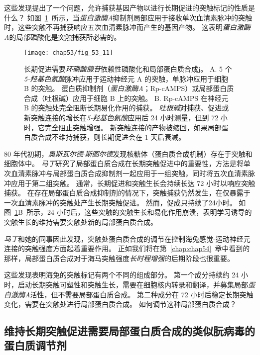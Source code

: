 这些发现提出了一个问题，允许捕获基因产物以进行长期促进的突触标记的性质是什么？
如图~\ref{fig:53_11}~所示，当\textit{蛋白激酶A}抑制剂局部应用于接收单次血清素脉冲的突触时，这些突触不再捕获响应五次血清素脉冲而产生的基因产物。
这表明\textit{蛋白激酶A}的局部磷酸化是突触捕获所必需的。


\begin{figure}[htbp]
	\centering
	\texttt{[image: chap53/fig\_53\_11]}
	\caption{长期促进需要\textit{环磷酸腺苷}依赖性磷酸化和局部蛋白质合成j\cite{casadio1999transient}。
		A. 5 个\textit{5-羟基色氨酸}脉冲应用于运动神经元 A 的突触，单脉冲应用于细胞 B 的突触。
		蛋白质抑制剂（\textit{蛋白激酶A}；Rp-cAMPS）或局部蛋白质合成（吐根碱）应用于细胞 B 上的突触。
		B. Rp-cAMPS 在神经元 B 的突触处完全阻断长期易化作用的捕获。
		\textit{吐根碱}对捕获、促进或新突触连接的增长在\textit{5-羟基色氨酸}应用后 24 小时测量，但到 72 小时，它完全阻止突触增强。
		新突触连接的产物被缩回，如果局部蛋白质合成不维持捕获，则长期促进会在 1 天后衰减。}
	\label{fig:53_11}
\end{figure}


80 年代初期，\textit{奥斯瓦尔德$\cdot$斯图尔德}发现核糖体（蛋白质合成机制）存在于突触和细胞体中。
\textit{马丁}研究了局部蛋白质合成在长期突触促进中的重要性，方法是将单次血清素脉冲与局部蛋白质合成抑制剂一起应用于一组突触，同时将五次血清素脉冲应用于第二组突触。
通常，长期促进和突触生长会持续长达 72 小时以响应突触捕获。
在存在局部蛋白质合成抑制剂的情况下，突触捕获仍然发生，在仅暴露于一次血清素脉冲的突触处产生长期突触促进。
然而，促成只持续了24小时。
如图~\ref{fig:53_11}B~所示，24 小时后，这些突触的突触生长和易化作用崩溃，表明学习诱导的突触生长的维持需要突触处新的局部蛋白质合成。


\textit{马丁}和她的同事因此发现，突触处蛋白质合成的调节在控制海兔感觉-运动神经元连接的突触强度方面起着重要作用。
正如我们将在第~\ref{chap:chap54}~章中看到的那样，局部蛋白质合成对于海马突触强度\textit{长时程增强}的后期阶段也很重要。


这些发现表明海兔的突触标记有两个不同的组成部分。
第一个成分持续约 24 小时，启动长期突触可塑性和突触生长，需要在细胞核内转录和翻译，并募集局部\textit{蛋白激酶A}活性，但不需要局部蛋白质合成。
第二种成分在 72 小时后稳定长期突触变化，需要在突触处进行局部蛋白质合成。
如何调节这种局部蛋白质合成？



\subsection{维持长期突触促进需要局部蛋白质合成的类似朊病毒的蛋白质调节剂}

